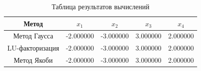 \begin{table}[H]
\centering
\caption{Таблица результатов вычислений}
\begin{tabular}{|c|c|c|c|c|}
\hline
Метод & $x_{1}$ & $x_{2}$ & $x_{3}$ & $x_{4}$ \\
\hline
Метод Гаусса & -2.000000 & -3.000000 & 3.000000 & 2.000000 \\
LU-факторизация & -2.000000 & -3.000000 & 3.000000 & 2.000000 \\
Метод Якоби & -2.000000 & -3.000000 & 3.000000 & 2.000000 \\
\hline
\end{tabular}
\end{table}